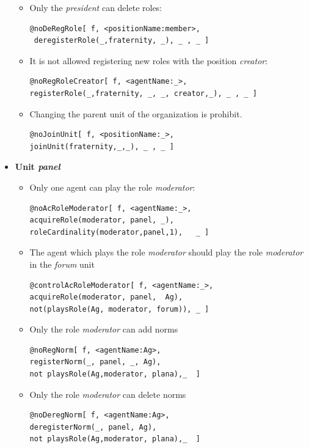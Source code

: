 \begin{itemize}
\begin{itemize}
\item Only the  \textit{president} can delete roles:
\begin{verbatim}
@noDeRegRole[ f, <positionName:member>,
 deregisterRole(_,fraternity, _), _ , _ ] 
\end{verbatim}

\item It is not allowed registering new roles with the position \textit{creator}:
\begin{verbatim}
@noRegRoleCreator[ f, <agentName:_>, 
registerRole(_,fraternity, _, _, creator,_), _ , _ ] 
\end{verbatim}


\item Changing the parent unit of the organization is prohibit.  
\begin{verbatim}
@noJoinUnit[ f, <positionName:_>, 
joinUnit(fraternity,_,_), _ , _ ] 
\end{verbatim}


\end{itemize}

\item \textbf{Unit \textit{panel}}
\begin{itemize}

\item  Only one agent can play the role \textit{moderator}:
\begin{verbatim}
@noAcRoleModerator[ f, <agentName:_>, 
acquireRole(moderator, panel, _),  
roleCardinality(moderator,panel,1),   _ ]
\end{verbatim}

\item The agent which plays the role \textit{moderator} should play the role \textit{moderator} in the \textit{forum} unit

\begin{verbatim} 
@controlAcRoleModerator[ f, <agentName:_>, 
acquireRole(moderator, panel,  Ag), 
not(playsRole(Ag, moderator, forum)), _ ]
\end{verbatim}

\item Only the role \textit{moderator} can add norms
\begin{verbatim}
@noRegNorm[ f, <agentName:Ag>, 
registerNorm(_, panel, _, Ag),
not playsRole(Ag,moderator, plana),_  ] 
\end{verbatim}

\item Only the role \textit{moderator} can delete norms
\begin{verbatim}
@noDeregNorm[ f, <agentName:Ag>, 
deregisterNorm(_, panel, Ag),
not playsRole(Ag,moderator, plana),_  ] 
\end{verbatim}


\end{itemize}
\end{itemize}
